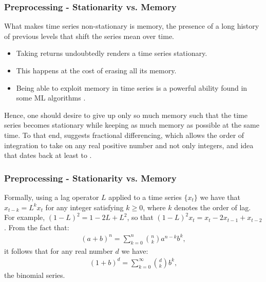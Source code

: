 \documentclass[xcolor=dvipsnames, english, 8pt]{beamer}
\begin{document}
\begin{frame}
    \frametitle{Preprocessing - Stationarity vs. Memory}
    What makes time series non-stationary is {\color{ubRed}memory}, the presence of a long history of previous levels that shift the series mean over time.\vspace{0.25cm}\\
    \begin{itemize}
        \item Taking returns undoubtedly renders a time series stationary.
        \item This happens at the cost of erasing all its memory.
        \item Being able to exploit memory in time series is a powerful ability found in some ML algorithms .\vspace{0.25cm}\\
    \end{itemize}

 Hence, one should desire to give up only so much memory such that the time series becomes stationary while keeping as much memory as possible at the same time. To that end, \cite{DePrado2018} suggests {\color{ubRed}fractional differencing}, which allows the order of integration to take on any real positive number and not only integers, and idea that dates back at least to \cite{Hosking1981}.
\end{frame}


\begin{frame}
    \frametitle{Preprocessing - Stationarity vs. Memory}
    Formally, using a lag operator $L$ applied to a time series $\{x_t\}$ we have that $x_{t-k} = L^kx_t$ for any integer satisfying $k\geq 0$, where $k$ denotes the order of lag. For example, $(1-L)^2 = 1-2L + L^2$, so that $(1-L)^2x_t = x_t - 2x_{t-1} + x_{t-2}$. From the fact that:
    \begin{align}
    (a + b)^n = \sum\limits_{k=0}^n \binom{n}{k} a^{n-k}b^k,
    \end{align}
    it follows that for any real number $d$ we have:
    \begin{align}
    (1 + b)^d = \sum\limits_{k=0}^{\infty} \binom{d}{k} b^k, \label{binomialcoeff}
    \end{align}
    the binomial series.
\end{frame}
\end{document}
